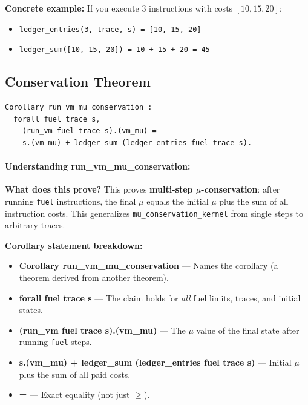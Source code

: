 \textbf{Concrete example:} If you execute 3 instructions with costs $[10, 15, 20]$:
\begin{itemize}
    \item \texttt{ledger\_entries(3, trace, s) = [10, 15, 20]}
    \item \texttt{ledger\_sum([10, 15, 20]) = 10 + 15 + 20 = 45}
\end{itemize}


\subsection{Conservation Theorem}

\begin{theorem}
\begin{lstlisting}
Corollary run_vm_mu_conservation :
  forall fuel trace s,
    (run_vm fuel trace s).(vm_mu) =
    s.(vm_mu) + ledger_sum (ledger_entries fuel trace s).
\end{lstlisting}
\end{theorem}

\paragraph{Understanding run\_vm\_mu\_conservation:}

\textbf{What does this prove?} This proves \textbf{multi-step $\mu$-conservation}: after running \texttt{fuel} instructions, the final $\mu$ equals the initial $\mu$ plus the sum of all instruction costs. This generalizes \texttt{mu\_conservation\_kernel} from single steps to arbitrary traces.

\textbf{Corollary statement breakdown:}
\begin{itemize}
    \item \textbf{Corollary run\_vm\_mu\_conservation} — Names the corollary (a theorem derived from another theorem).
    \item \textbf{forall fuel trace s} — The claim holds for \textit{all} fuel limits, traces, and initial states.
    \item \textbf{(run\_vm fuel trace s).(vm\_mu)} — The $\mu$ value of the final state after running \texttt{fuel} steps.
    \item \textbf{s.(vm\_mu) + ledger\_sum (ledger\_entries fuel trace s)} — Initial $\mu$ plus the sum of all paid costs.
    \item \textbf{=} — Exact equality (not just $\geq$).
\end{itemize}


